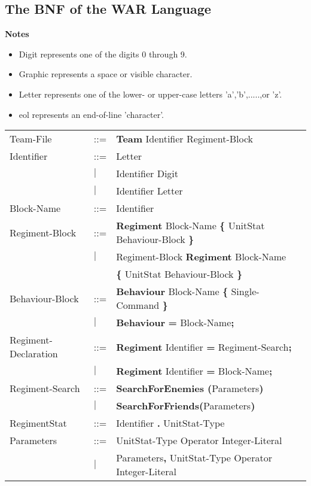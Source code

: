 	\subsection{The BNF of the WAR Language}
		{\bf Notes}
		\begin{itemize}
			\item Digit represents one of the digits 0 through 9.
			\item Graphic represents a space or visible character.
			\item Letter represents one of the lower- or upper-case letters 'a','b',.....,or 'z'.
			\item eol represents an end-of-line 'character'.
		\end{itemize}
		\begin{center}
			\begin{longtable}{l l l}
				\endfirsthead
				\endhead
		Team-File					&	::=	&{\bf Team} Identifier Regiment-Block\\
		Identifier					&	::=	&Letter\\
									&$\mid$	&Identifier Digit\\
									&$\mid$	&Identifier Letter\\
		Block-Name					&	::=	&Identifier\\
		Regiment-Block				&	::=	&{\bf Regiment} Block-Name {\bf \{ } UnitStat Behaviour-Block \bf{\} }\\
									&$\mid$	&Regiment-Block {\bf Regiment} Block-Name\\
									&		&{\bf \{ } UnitStat Behaviour-Block \bf{\} }\\
		Behaviour-Block				&	::=	&{\bf Behaviour} Block-Name {\bf \{} Single-Command {\bf \}}  \\
									&$\mid$	& {\bf Behaviour} {\bf = } Block-Name{\bf ;} \\
		Regiment-Declaration			&	::=	&{\bf Regiment} Identifier {\bf =} Regiment-Search{\bf ;}\\
									&$\mid$	&{\bf Regiment} Identifier {\bf =} Block-Name{\bf ;}\\
		Regiment-Search				&	::=	&{\bf SearchForEnemies (}Parameters{\bf)}\\
									&$\mid$	&{\bf SearchForFriends(}Parameters{\bf)}\\
		RegimentStat				&	::=	&Identifier {\bf.} UnitStat-Type \\
		Parameters					&	::=	&UnitStat-Type Operator Integer-Literal\\
		 							&$\mid$	&Parameters{\bf ,} UnitStat-Type Operator Integer-Literal\\

\end{longtable}
\end{center}
